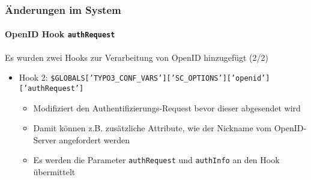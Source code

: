 \begin{frame}[fragile]
	\frametitle{Änderungen im System}
	\framesubtitle{OpenID Hook \texttt{authRequest}}

	\lstset{basicstyle=\tiny\ttfamily}

	Es wurden zwei Hooks zur Verarbeitung von OpenID hinzugefügt (2/2)

		\begin{itemize}

			\item Hook 2:\newline
				\smaller\smaller
					\texttt{\$GLOBALS['TYPO3\_CONF\_VARS']['SC\_OPTIONS']['openid']['authRequest']}
				\normalsize

				\begin{itemize}
					\item Modifiziert den Authentifizierungs-Request bevor dieser abgesendet wird
					\item Damit können z.B. zusätzliche Attribute, wie der Nickname vom OpenID-Server angefordert werden
					\item Es werden die Parameter \texttt{authRequest} und \texttt{authInfo} an den Hook übermittelt
				\end{itemize}

		\end{itemize}

\end{frame}

